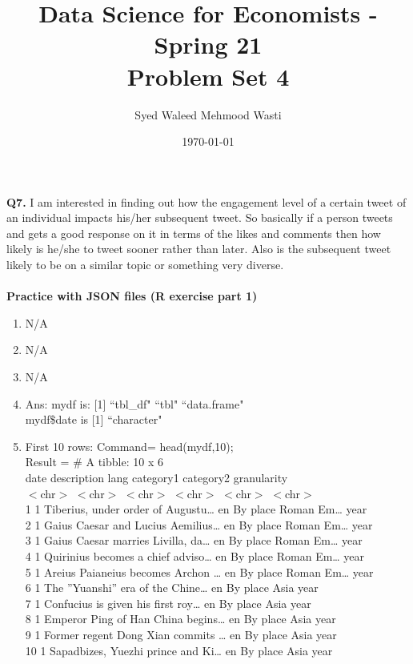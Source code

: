 \documentclass[12pt]{article}
\title{\textbf{Data Science for Economists - Spring 21 \\
\vspace{0.5cm}
Problem Set 4}}
\author{Syed Waleed Mehmood Wasti}
\date{\today}
\begin{document}
\begin{titlepage}
\maketitle
\thispagestyle{empty}
\end{titlepage}



\textbf{Q7.} I am interested in finding out how the engagement level of a certain tweet of an individual impacts his/her subsequent tweet. So basically if a person tweets and gets a good response on it in terms of the likes and comments then how likely is he/she to tweet sooner rather than later. Also is the subsequent tweet likely to be on a similar topic or something very diverse. \\\\


\textbf{Practice with JSON files (R exercise part 1)}
  
\begin{enumerate}[label=\alph*]
  \item N/A
  \item N/A
  \item N/A
  \item Ans: mydf is:  [1] ``tbl\_df"     ``tbl"        ``data.frame"\\
   mydf\$date is [1] ``character"
  \item
  
  First 10 rows: Command= head(mydf,10); \\ 
Result = # A tibble: 10 x 6 \\
date  description                       lang  category1 category2 granularity \\
$<$chr$>$ $<$chr$>$                             $<$chr$>$ $<$chr$>$    $<$chr$>$     $<$chr$>$ \\
1 1     Tiberius, under order of Augustu… en    By place  Roman Em… year \\
2 1     Gaius Caesar and Lucius Aemilius… en    By place  Roman Em… year \\
3 1     Gaius Caesar marries Livilla, da… en    By place  Roman Em… year \\
4 1     Quirinius becomes a chief adviso… en    By place  Roman Em… year \\
5 1     Areius Paianeius becomes Archon … en    By place  Roman Em… year \\
6 1     The ''Yuanshi'' era of the Chine… en    By place  Asia      year \\
7 1     Confucius is given his first roy… en    By place  Asia      year \\
8 1     Emperor Ping of Han China begins… en    By place  Asia      year \\
9 1     Former regent Dong Xian commits … en    By place  Asia      year \\
10 1     Sapadbizes, Yuezhi prince and Ki… en    By place  Asia      year \\


  
  
\end{enumerate}
\end{document}

